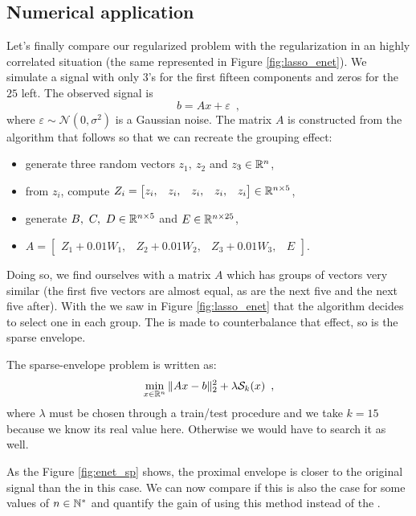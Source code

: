 \subsection{Numerical application}

Let's finally compare our regularized problem with the \enet
regularization in an highly correlated situation (the same represented in Figure \ref{fig:lasso_enet}).
We simulate a signal with only $3$'s for the first fifteen components and zeros for the $25$ left. The observed signal is 
\[ b = Ax + \varepsilon\enspace,\]
where $\varepsilon\sim\mathcal{N}(0,\sigma^2)$ is a Gaussian noise.
The matrix $A$ is constructed from the algorithm that follows so that we can recreate the grouping effect:
\begin{itemize}
\setlength{\arraycolsep}{1pt} %
    \item generate three random vectors $z_1,\ z_2$ and $z_3\in\mathbb{R}^n$,
    \item from $z_i$, compute $Z_i=\begin{bmatrix} z_i, & z_i, & z_i, & z_i, & z_i\end{bmatrix}\in\mathbb{R}^{n\times 5}$,
    \item generate $B,\ C,\ D\in\mathbb{R}^{n\times 5}$ and $E\in\mathbb{R}^{n\times 25}$,
    \item $A=\begin{bmatrix}Z_1 + 0.01 W_1, & Z_2 + 0.01 W_2, & Z_3 + 0.01 W_3, & E \end{bmatrix}$.
\end{itemize}
Doing so, we find ourselves with a matrix $A$ which has groups of vectors very similar (the first five vectors are almost equal, as are the next five and the next five after). With the \lasso we saw in Figure \ref{fig:lasso_enet} that the algorithm decides to select one in each group. The \enet is made to counterbalance that effect, so is the sparse envelope.


The sparse-envelope problem is written as:
\[\min_{x\in \mathbb{R}^n} \|Ax-b\|^2_2 + \lambda\mathcal{S}_k(x)\enspace,\]
where $\lambda$ must be chosen through a train/test procedure and we take $k=15$ because we know its real value here. Otherwise we would have to search it as well.

\medskip

As the Figure \ref{fig:enet_sp} shows, the proximal envelope is closer to the original signal than the \enet in this case.
We can now compare if this is also the case for some values of $n\in\mathbb{N}^*$ and quantify the gain of using this method instead of the \enet.


